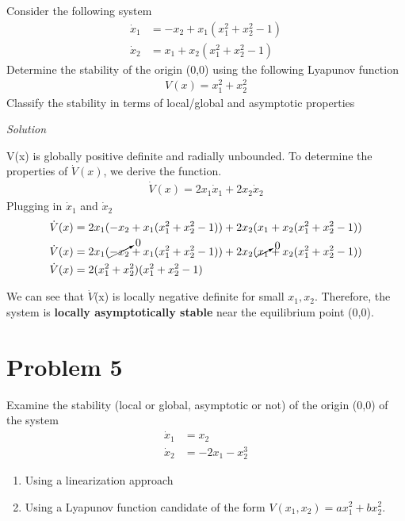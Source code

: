 \documentclass{article}
\begin{document}
  Consider the following system
  \begin{align*}
    \dot{x}_1 &= -x_2 + x_1(x_1^2+x_2^2-1) \\
    \dot{x}_2 &= x_1 + x_2(x_1^2+x_2^2-1)
  \end{align*}
  Determine the stability of the origin (0,0) using the following Lyapunov
  function
  \begin{align*}
    V(x) = x_1^2 + x_2^2
  \end{align*}
  Classify the stability in terms of local/global and asymptotic properties

  \vspace{3mm}
  
  \noindent \textit{Solution} \newline \newline

  \noindent V(x) is globally positive definite and radially unbounded. \newline
  To determine the properties of $\dot{V}(x)$, we derive the function.
  \begin{align*}
    \dot{V}(x) = 2x_1\dot{x}_1 + 2x_2\dot{x}_2
  \end{align*}
  \indent Plugging in $\dot{x}_1$ and $\dot{x}_2$
  \begin{align*}
    \dot{V}(x) &= 2x_1(-x_2 + x_1(x_1^2+x_2^2-1)) + 2x_2(x_1 + x_2(x_1^2+x_2^2-1)) \\
    \dot{V}(x) &= 2x_1(\cancelto{0}{-x_2} + x_1(x_1^2+x_2^2-1)) + 2x_2(\cancelto{0}{x_1} + x_2(x_1^2+x_2^2-1)) \\
    \dot{V}(x) &= 2(x_1^2 + x_2^2)(x_1^2+x_2^2-1) 
  \end{align*}

  We can see that $\dot{V}$(x) is locally negative definite for small $x_1,
  x_2$. Therefore, the system is \textbf{locally asymptotically stable} near the
  equilibrium point (0,0).

  \newpage

  \section{Problem 5}

  Examine the stability (local or global, asymptotic or not) of the origin (0,0)
  of the system
  \begin{align*}
    \dot{x}_1 &= x_2 \\
    \dot{x}_2 &= -2x_1 - x_2^3
  \end{align*}
  \begin{enumerate}[label=(\alph*)]
    \item Using a linearization approach
    \item Using a Lyapunov function candidate of the form $V(x_1, x_2) = ax_1^2
    + bx_2^2$.
  \end{enumerate}
\end{document}
